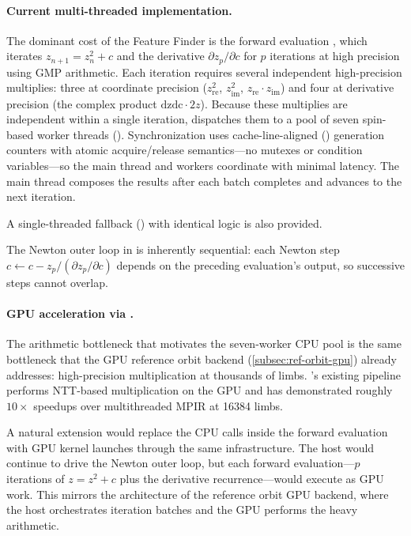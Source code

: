 \paragraph{Current multi-threaded implementation.}
The dominant cost of the Feature Finder is the forward evaluation
, which iterates $z_{n+1}=z_n^2+c$ and
the derivative $\partial z_p/\partial c$ for $p$ iterations at high precision
using GMP  arithmetic.  Each iteration requires several
independent high-precision multiplies: three at coordinate precision
($z_{\mathrm{re}}^2$, $z_{\mathrm{im}}^2$, $z_{\mathrm{re}} \cdot
z_{\mathrm{im}}$) and four at derivative precision (the complex product
$\mathrm{dzdc} \cdot 2z$).  Because these multiplies are independent within a
single iteration, \FractalShark{} dispatches them to a pool of seven spin-based
worker threads ().  Synchronization uses cache-line-aligned
() generation counters with atomic acquire/release
semantics---no mutexes or condition variables---so the main thread and workers
coordinate with minimal latency.  The main thread composes the results after
each batch completes and advances to the next iteration.

A single-threaded fallback () with
identical logic is also provided.

The Newton outer loop in  is inherently
sequential: each Newton step $c \leftarrow c - z_p / (\partial z_p / \partial
c)$ depends on the preceding evaluation's output, so successive steps cannot
overlap.

\paragraph{GPU acceleration via .}
The arithmetic bottleneck that motivates the seven-worker CPU pool is the same
bottleneck that the GPU reference orbit backend (\cref{subsec:ref-orbit-gpu})
already addresses: high-precision multiplication at thousands of limbs.
\FractalShark{}'s existing  pipeline performs NTT-based
multiplication on the GPU and has demonstrated roughly $10\times$ speedups over
multithreaded MPIR at 16384 limbs.

A natural extension would replace the CPU  calls inside the
forward evaluation with GPU kernel launches through the same
 infrastructure.  The host would continue to drive the
Newton outer loop, but each forward evaluation---$p$ iterations of $z=z^2+c$
plus the derivative recurrence---would execute as GPU work.  This mirrors the
architecture of the reference orbit GPU backend, where the host orchestrates
iteration batches and the GPU performs the heavy arithmetic.

